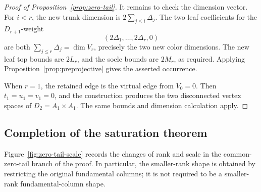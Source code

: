 \begin{proof}[Proof of Proposition~\ref{prop:zero-tail}]
It remains to check the dimension vector.  For
\(i<r\), the new trunk dimension is
\(2\sum_{j\le i}\Delta_j\).
The two leaf coefficients for the \(D_{r+1}\)-weight
\[
 (2\Delta_1,\ldots,2\Delta_r,0)
\]
are both \(\sum_{j\le r}\Delta_j=\dim V_r\), precisely the two new
color dimensions.  The new leaf top bounds are \(2L_r\), and the
socle bounds are \(2M_r\), as required.  Applying
Proposition~\ref{prop:preprojective} gives the asserted occurrence.

When \(r=1\), the retained edge is the virtual edge from \(V_0=0\).
Then \(t_1=u_1=v_1=0\), and the construction produces the two
disconnected vertex spaces of \(D_2=A_1\times A_1\).  The same bounds
and dimension calculation apply.
\end{proof}

\subsection{Completion of the saturation theorem}

Figure~\ref{fig:zero-tail-scale} records the changes of rank and
scale in the common-zero-tail branch of the proof. In particular,
the smaller-rank shape is obtained by restricting the original
fundamental columns; it is not required to be a smaller-rank
fundamental-column shape.


